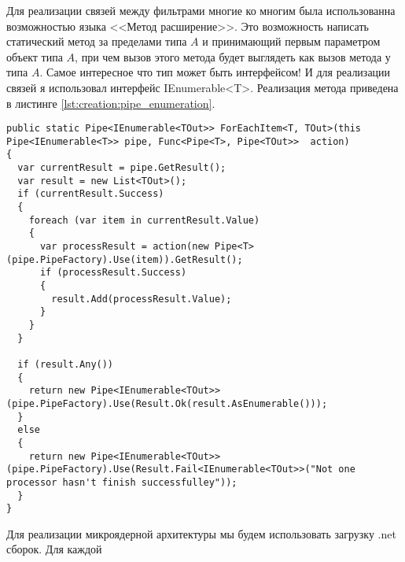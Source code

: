 Для реализации связей между фильтрами многие ко многим была использованна возможностью языка \csharp{} <<Метод расширение>>. Это возможность написать статический метод за пределами типа $A$ и принимающий первым параметром объект типа $A$, при чем вызов этого метода будет выглядеть как вызов метода у типа $A$. Самое интересное что тип может быть интерфейсом! И для реализации связей я использовал интерфейс IEnumerable<T>. Реализация метода приведена в листинге \ref{lst:creation:pipe_enumeration}.
\begin{lstlisting}[style=fsharpstyle,caption={Определение метода расширения класса Pipe},label=lst:creation:pipe_enumeration]
public static Pipe<IEnumerable<TOut>> ForEachItem<T, TOut>(this Pipe<IEnumerable<T>> pipe, Func<Pipe<T>, Pipe<TOut>>  action)
{
  var currentResult = pipe.GetResult();
  var result = new List<TOut>();
  if (currentResult.Success)
  {
    foreach (var item in currentResult.Value)
    {
      var processResult = action(new Pipe<T>(pipe.PipeFactory).Use(item)).GetResult();
      if (processResult.Success)
      {
        result.Add(processResult.Value);
      }
    }
  }

  if (result.Any())
  {
    return new Pipe<IEnumerable<TOut>>(pipe.PipeFactory).Use(Result.Ok(result.AsEnumerable()));
  }
  else
  {
    return new Pipe<IEnumerable<TOut>>(pipe.PipeFactory).Use(Result.Fail<IEnumerable<TOut>>("Not one processor hasn't finish successfulley"));
  }
}
\end{lstlisting}

Для реализации микроядерной архитектуры мы будем использовать загрузку .net сборок. Для каждой 
